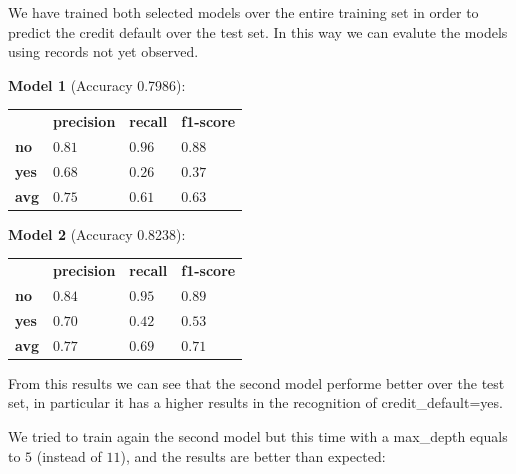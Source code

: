 We have trained both selected models over the entire training set in order to predict the credit default over the test set. In this way we can evalute the models using records not yet observed.

\medskip

\textbf{Model 1} (Accuracy 0.7986):

\begin{table}[h]
\centering
\begin{adjustbox}{width=.30\textwidth}
\small
\begin{tabular}{llll}
               & \textbf{precision} & \textbf{recall} & \textbf{f1-score} \\ \rowcolor[HTML]{EFEFEF} 
 \textbf{no}   &  $0.81$            & $0.96$          & $0.88$            \\
 \textbf{yes}  &  $0.68$            & $0.26$          & $0.37$            \\ \rowcolor[HTML]{EFEFEF} 
 \textbf{avg}  &  $0.75$            & $0.61$          & $0.63$            \\
\end{tabular}
\end{adjustbox}
\end{table}

\medskip

\textbf{Model 2} (Accuracy 0.8238):

\begin{table}[h]
\centering
\begin{adjustbox}{width=.30\textwidth}
\small
\begin{tabular}{llll}
               & \textbf{precision} & \textbf{recall} & \textbf{f1-score} \\ \rowcolor[HTML]{EFEFEF} 
 \textbf{no}   &  $0.84$            & $0.95$          & $0.89$            \\
 \textbf{yes}  &  $0.70$            & $0.42$          & $0.53$            \\ \rowcolor[HTML]{EFEFEF} 
 \textbf{avg}  &  $0.77$            & $0.69$          & $0.71$            \\
\end{tabular}
\end{adjustbox}
\end{table}


From this results we can see that the second model performe better over the test set, in particular it has a higher results in the recognition of credit\_default=yes.

We tried to train again the second model but this time with a max\_depth equals to $5$ (instead of $11$), and the results are better than expected:

